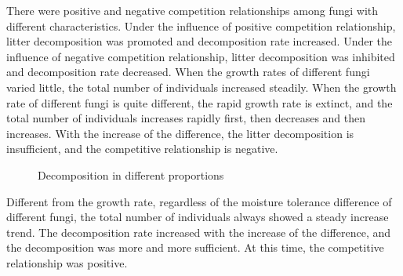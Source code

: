 \documentclass{mcmthesis}
\begin{document}
There were positive and negative competition relationships among fungi with different characteristics. Under the influence of positive competition relationship, litter decomposition was promoted and decomposition rate increased. Under the influence of negative competition relationship, litter decomposition was inhibited and decomposition rate decreased. When the growth rates of different fungi varied little, the total number of individuals increased steadily. When the growth rate of different fungi is quite different, the rapid growth rate is extinct, and the total number of individuals increases rapidly first, then decreases and then increases. With the increase of the difference, the litter decomposition is insufficient, and the competitive relationship is negative. 

\begin{figure}[H]
	\centering
	\quad
	\caption{Decomposition in different proportions}
	
\end{figure} 



Different from the growth rate, regardless of the moisture tolerance difference of different fungi, the total number of individuals always showed a steady increase trend. The decomposition rate increased with the increase of the difference, and the decomposition was more and more sufficient. At this time, the competitive relationship was positive. 
\end{document}
